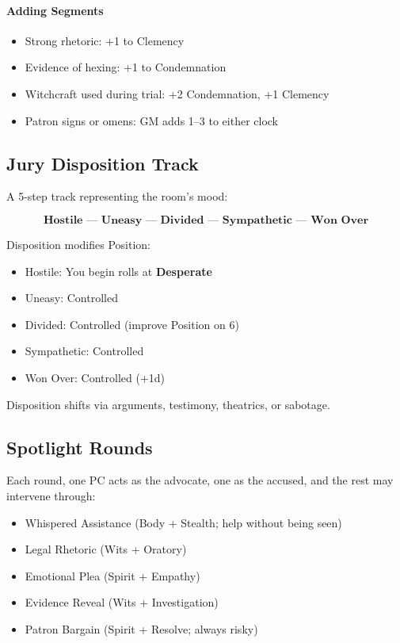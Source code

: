 \documentclass[11pt]{book}
\begin{document}
\paragraph{Adding Segments}
\begin{itemize}
    \item Strong rhetoric: +1 to Clemency  
    \item Evidence of hexing: +1 to Condemnation  
    \item Witchcraft used during trial: +2 Condemnation, +1 Clemency  
    \item Patron signs or omens: GM adds 1--3 to either clock
\end{itemize}


\subsection*{Jury Disposition Track}
A 5-step track representing the room's mood:

\[
\textbf{Hostile --- Uneasy --- Divided --- Sympathetic --- Won Over}
\]

Disposition modifies Position:

\begin{itemize}[leftmargin=1.5em]
    \item Hostile: You begin rolls at \textbf{Desperate}
    \item Uneasy: Controlled
    \item Divided: Controlled (improve Position on 6)
    \item Sympathetic: Controlled
    \item Won Over: Controlled (+1d)
\end{itemize}

Disposition shifts via arguments, testimony, theatrics, or sabotage.


\subsection*{Spotlight Rounds}
Each round, one PC acts as the advocate, one as the accused,  
and the rest may intervene through:

\begin{itemize}[leftmargin=1.5em]
    \item Whispered Assistance (Body + Stealth; help without being seen)
    \item Legal Rhetoric (Wits + Oratory)
    \item Emotional Plea (Spirit + Empathy)
    \item Evidence Reveal (Wits + Investigation)
    \item Patron Bargain (Spirit + Resolve; always risky)
\end{itemize}
\end{document}
